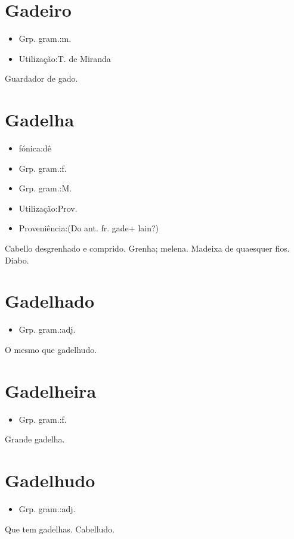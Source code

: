 \section{Gadeiro}
\begin{itemize}
\item {Grp. gram.:m.}
\end{itemize}
\begin{itemize}
\item {Utilização:T. de Miranda}
\end{itemize}
Guardador de gado.
\section{Gadelha}
\begin{itemize}
\item {fónica:dê}
\end{itemize}
\begin{itemize}
\item {Grp. gram.:f.}
\end{itemize}
\begin{itemize}
\item {Grp. gram.:M.}
\end{itemize}
\begin{itemize}
\item {Utilização:Prov.}
\end{itemize}
\begin{itemize}
\item {Proveniência:(Do ant. fr. \textunderscore gade\textunderscore  + \textunderscore lain\textunderscore ?)}
\end{itemize}
Cabello desgrenhado e comprido.
Grenha; melena.
Madeixa de quaesquer fios.
Diabo.
\section{Gadelhado}
\begin{itemize}
\item {Grp. gram.:adj.}
\end{itemize}
O mesmo que \textunderscore gadelhudo\textunderscore .
\section{Gadelheira}
\begin{itemize}
\item {Grp. gram.:f.}
\end{itemize}
Grande gadelha.
\section{Gadelhudo}
\begin{itemize}
\item {Grp. gram.:adj.}
\end{itemize}
Que tem gadelhas.
Cabelludo.
